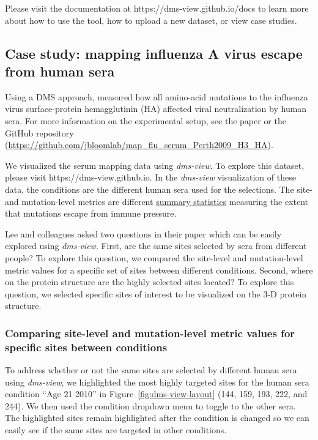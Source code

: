Please visit the documentation at https://dms-view.github.io/docs to learn more about how to use the tool, how to upload a new dataset, or view case studies.

\subsection{Case study: mapping influenza A virus escape from human sera}

Using a DMS approach, \citet{Lee2019} measured how all amino-acid mutations to the influenza virus surface-protein hemagglutinin (HA) affected viral neutralization by human sera.
For more information on the experimental setup, see the paper \citep{Lee2019} or the GitHub repository (\url{https://github.com/jbloomlab/map_flu_serum_Perth2009_H3_HA}).

We visualized the \citet{Lee2019} serum mapping data using \emph{dms-view}.
To explore this dataset, please visit https://dms-view.github.io.
In the \emph{dms-view} visualization of these data, the conditions are the different human sera used for the selections.
The site- and mutation-level metrics are different \href{https://jbloomlab.github.io/dms_tools2/diffsel.html}{summary statistics} measuring the extent that mutations escape from immune pressure.

Lee and colleagues asked two questions in their paper which can be easily explored using \emph{dms-view}.
First, are the same sites selected by sera from different people?
To explore this question, we compared the site-level and mutation-level metric values for a specific set of sites between different conditions.
Second, where on the protein structure are the highly selected sites located?
To explore this question, we selected specific sites of interest to be visualized on the 3-D protein structure.

\subsubsection{Comparing site-level and mutation-level metric values for specific sites between conditions}

To address whether or not the same sites are selected by different human sera using \emph{dms-view}, we highlighted the most highly targeted sites for the human sera condition ``Age 21 2010'' in Figure~\ref{fig:dms-view-layout} (144, 159, 193, 222, and 244).
We then used the condition dropdown menu to toggle to the other sera.
The highlighted sites remain highlighted after the condition is changed so we can easily see if the same sites are targeted in other conditions.

